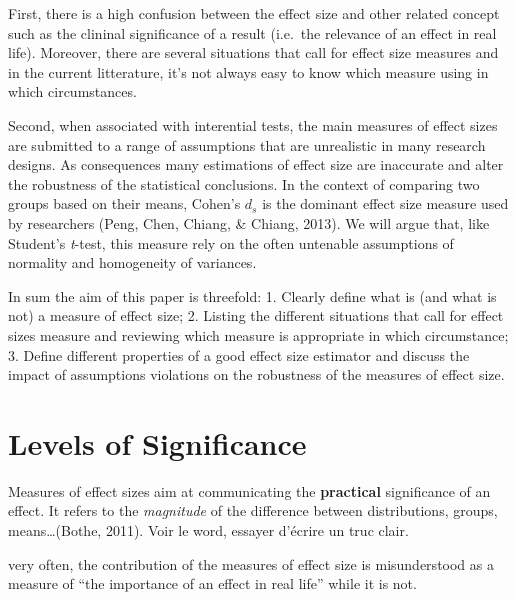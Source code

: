 \documentclass[man]{apa6}
\begin{document}
First, there is a high confusion between the effect size and other related concept such as the clininal significance of a result (i.e.~the relevance of an effect in real life). Moreover, there are several situations that call for effect size measures and in the current litterature, it's not always easy to know which measure using in which circumstances.

Second, when associated with interential tests, the main measures of effect sizes are submitted to a range of assumptions that are unrealistic in many research designs. As consequences many estimations of effect size are inaccurate and alter the robustness of the statistical conclusions. In the context of comparing two groups based on their means, Cohen's \(d_{s}\) is the dominant effect size measure used by researchers (Peng, Chen, Chiang, \& Chiang, 2013). We will argue that, like Student's \emph{t}-test, this measure rely on the often untenable assumptions of normality and homogeneity of variances.

In sum the aim of this paper is threefold:
1. Clearly define what is (and what is not) a measure of effect size;
2. Listing the different situations that call for effect sizes measure and reviewing which measure is appropriate in which circumstance;
3. Define different properties of a good effect size estimator and discuss the impact of assumptions violations on the robustness of the measures of effect size.

\hypertarget{levels-of-significance}{%
\section{Levels of Significance}\label{levels-of-significance}}

Measures of effect sizes aim at communicating the \textbf{practical} significance of an effect. It refers to the \emph{magnitude} of the difference between distributions, groups, means\ldots{}(Bothe, 2011). Voir le word, essayer d'écrire un truc clair.

very often, the contribution of the measures of effect size is misunderstood as a measure of \enquote{the importance of an effect in real life} while it is not.
\end{document}
